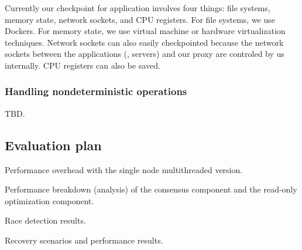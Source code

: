 Currently our checkpoint for application involves four things: file systems, memory state,
network sockets, and CPU registers. For file systems, we use Dockers.
For memory state, we use virtual machine or hardware virtualization 
techniques. Network sockets can also easily checkpointed because the network 
sockets between the applications (\eg, servers) and our proxy are controled by 
us internally. CPU registers can also be saved.



\subsubsection{Handling nondeterministic operations} \label{sec:replication-impl-nondet}
TBD.

\subsection{Evaluation plan} \label{sec:replication-eval}
Performance overhead with the single node multithreaded version.

Performance breakdown (analysis) of the consensus component and the read-only optimization component.

Race detection results.

Recovery scenarios and performance results.



